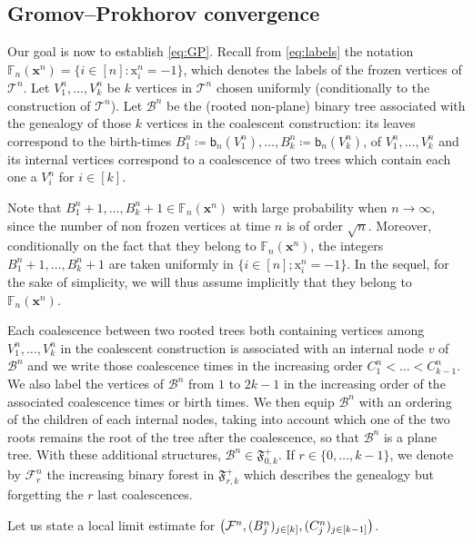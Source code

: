 \documentclass[11pt]{article}
\theoremstyle{plain}
\theoremstyle{definition}
\theoremstyle{remark}
\newcommand{\1}{\mathbbm{1}} %
\newcommand{\T}{\mathcal{T}} %
\newcommand{\birth}{\mathsf{b}} %
\newcommand{\Xb}{\mathrm{\mathbf{x}}} %
\newcommand{\X}{\mathrm x} %
\newcommand{\Fbb}{\mathbb{F}} %
\let\originalleft\left
\let\originalright\right
\renewcommand{\left}{\mathopen{}\mathclose\bgroup\originalleft}
\renewcommand{\right}{\aftergroup\egroup\originalright}
\begin{document}
\subsection{Gromov--Prokhorov convergence}
\label{sec:GPcv}

Our goal is now to establish \eqref{eq:GP}. Recall from \eqref{eq:labels} the notation $\Fbb_{n}(\Xb^n)=  \{i \in [n]: \X_{i}^n=-1\}$, which denotes the labels of the frozen vertices of $\T
^{n}$.
Let $V_1^n,\ldots,V_k^n$ be $k$ vertices in $\T^n$ chosen uniformly (conditionally to the construction of $\T^n$). Let $\mathcal{B}^n$ be the (rooted non-plane) binary tree associated with the genealogy of those $k$ vertices in the coalescent construction: its leaves correspond to the birth-times $B_1^n\coloneqq \birth_n(V_1^n),\ldots, B_k^n\coloneqq \birth_n(V_k^n)$, of $V_1^n,\ldots,V_k^n$ and its internal vertices correspond to a coalescence of two trees which contain each one a $V^n_i$ for $i\in [k]$. 

Note that $B_1^n+1,\ldots, B_k^n+1 \in \Fbb_{n}(\Xb^n)$ with large probability when $n\to \infty$, since the number of non frozen vertices at time $n$ is of order $\sqrt{n}$. Moreover, conditionally on the fact that they belong to $\Fbb_{n}(\Xb^n)$, the integers $B_1^n+1, \ldots, B_k^n+1$ are taken uniformly in $\{ i \in  [n]; \X^n_i=-1\}$. In the sequel, for the sake of simplicity, we will thus assume implicitly that they belong to $\Fbb_{n}(\Xb^n)$.  

Each coalescence between two {rooted} trees both containing vertices among $V_1^n,\ldots,V_k^n$ in the coalescent construction is associated with an internal node $v$ of $\mathcal{B}^n$ and we write those coalescence times in the increasing order $C^n_1<\ldots<C^n_{k-1}$. We also label the vertices of $\mathcal{B}^n$ from $1$ to $2k-1$ in the increasing order of the associated coalescence times or birth times. We then equip $\mathcal{B}^n$ with an ordering of the children of each internal nodes, taking into account which one of the two roots remains the root of the tree after the coalescence, so that $\mathcal{B}^n$ is a plane tree. With these additional structures, $\mathcal{B}^n \in \mathfrak{F}^+_{0,k}$. If $r \in \{0,\ldots,k-1\}$, we denote by $\mathcal{F}^n_r$ the increasing binary forest in $\mathfrak{F}^+_{r,k}$ which describes the genealogy but forgetting the $r$ last coalescences. 

Let us state a local limit estimate for $\left(\mathcal{F}^n, (B_j^n)_{j \in [k]}, (C_j^n)_{j \in [k-1]} \right)$. 
\end{document}
